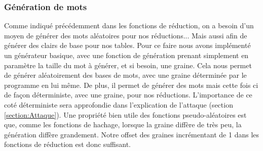 \documentclass[french,12pt]{article}
\begin{document}
         \subsubsection{Génération de mots}
         Comme indiqué précédemment dans les fonctions de réduction, on a besoin d'un moyen de générer des mots aléatoires pour nos réductions... Mais aussi afin de générer des clairs de base pour nos tables. Pour ce faire nous avons implémenté un générateur basique, avec une fonction de génération prenant simplement en paramètre la taille du mot à générer, et si besoin, une graine. Cela nous permet de générer aléatoirement des bases de mots, avec une graine déterminée par le programme en lui même. De plus, il permet de générer des mots mais cette fois ci de façon déterministe, avec une graine, pour nos réductions\cite{WikiPseudoAleatoire}.
         L'importance de ce coté déterministe sera approfondie dans l'explication de l'attaque (section \ref{section:Attaque}).
         \newline
         \indent Une propriété bien utile des fonctions pseudo-aléatoires est que, comme les fonctions de hachage, lorsque la graine diffère de très peu, la génération diffère grandement. Notre offset des graines incrémentant de 1 dans les fonctions de réduction est donc suffisant.
\end{document}
